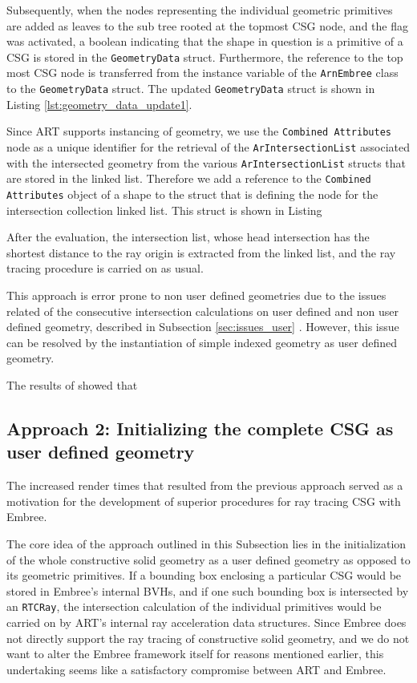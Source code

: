 Subsequently, when the nodes representing the individual geometric primitives are added as leaves to the sub tree rooted at the topmost CSG node, and the flag was activated, a boolean indicating that the shape in question is a primitive of a CSG is stored in the \texttt{GeometryData} struct. Furthermore, the reference to the top most CSG node is transferred from the instance variable of the \texttt{ArnEmbree} class to the \texttt{GeometryData} struct. The updated \texttt{GeometryData} struct is shown in Listing \ref{lst:geometry_data_update1}.


Since ART supports instancing of geometry, we use the \texttt{Combined Attributes} node as a unique identifier for the retrieval of the \texttt{ArIntersectionList} associated with the intersected geometry from the various \texttt{ArIntersectionList} structs that are stored in the linked list.
Therefore we add a reference to the \texttt{Combined Attributes} object of a shape to the struct that is defining the node for the intersection collection linked list. This struct is shown in Listing 

After the evaluation, the intersection list, whose head intersection has the shortest distance to the ray origin is extracted from the linked list, and the ray tracing procedure is carried on as usual.

This approach is error prone to non user defined geometries due to the issues related of the consecutive intersection calculations on user defined and non user defined geometry, described in Subsection \ref{sec:issues_user} . However, this issue can be resolved by the instantiation of simple indexed geometry as user defined geometry.

The results of \cite{karaffova2016} showed that


\subsection{Approach 2: Initializing the complete CSG as user defined geometry}
\label{subsec:apprach2}

The increased render times that resulted from the previous approach served as a motivation for the development of superior procedures for ray tracing CSG with Embree. 

The core idea of the approach outlined in this Subsection lies in the initialization of the whole constructive solid geometry as a user defined geometry as opposed to its geometric primitives. If a bounding box enclosing a particular CSG would be stored in Embree's internal BVHs, and if one such bounding box is intersected by an \texttt{RTCRay}, the intersection calculation of the individual primitives would be carried on by ART's internal ray acceleration data structures. Since Embree does not directly support the ray tracing of constructive solid geometry, and we do not want to alter the Embree framework itself for reasons mentioned earlier, this undertaking seems like a satisfactory compromise between ART and Embree.

